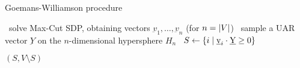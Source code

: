 \begin{algorithm}
    \caption{Goemans-Williamson procedure}\label{alg:GW}
    \begin{algorithmic}%
            \State~solve Max-Cut SDP, obtaining vectors $\underbar{v}_1, \dots, \underbar{v}_n$ (for $n = \vert V \vert$)
            \State~sample a UAR vector $\underbar{Y}$ on the $n$-dimensional hypersphere $H_n$
            \State~$S \gets \{ i \; \vert \; \underbar{v}_i \cdot \underbar{Y} \geq 0 \}$

            \Return $(S, V \setminus S)$
        \EndProcedure\@
    \end{algorithmic}
\end{algorithm}
